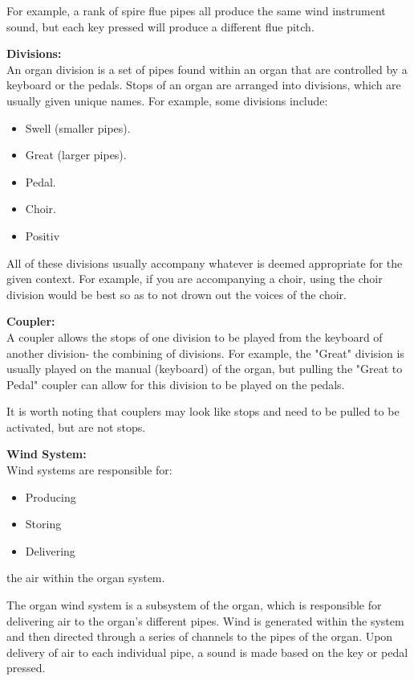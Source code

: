 For example, a rank of spire flue pipes all produce the same wind instrument sound, but each key pressed will produce a different flue pitch.  \cite{organvideo}

\medskip
\noindent \textbf{Divisions:}
\\ \hspace*{0.5cm} An organ division is a set of pipes found within an organ that are controlled by a keyboard or the pedals. Stops of an organ are arranged into divisions, which are usually given unique names. For example, some divisions include:
\begin{itemize}
\item Swell (smaller pipes).
\item Great (larger pipes).
\item Pedal.
\item Choir.
\item Positiv
\end{itemize}

All of these divisions usually accompany whatever is deemed appropriate for the given context. For example, if you are accompanying a choir, using the choir division would be best so as to not drown out the voices of the choir.  \cite{organvideo}

\medskip
\noindent \textbf{Coupler:}
\\ \hspace*{0.5cm} A coupler allows the stops of one division to be played from the keyboard of another division- the combining of divisions. For example, the "Great" division is usually played on the manual (keyboard) of the organ, but pulling the "Great to Pedal" coupler can allow for this division to be played on the pedals.

It is worth noting that couplers may look like stops and need to be pulled to be activated, but are not stops. \cite{organvideo}

\medskip
\noindent \textbf{Wind System:}
\\ \hspace*{0.5cm} Wind systems are responsible for:
\begin{itemize}
\item Producing
\item Storing
\item Delivering
\end{itemize}
the air within the organ system.

The organ wind system is a subsystem of the organ, which is responsible for delivering air to the organ's different pipes. Wind is generated within the system and then directed through a series of channels to the pipes of the organ. Upon delivery of air to each individual pipe, a sound is made based on the key or pedal pressed. \cite{organvideo}

